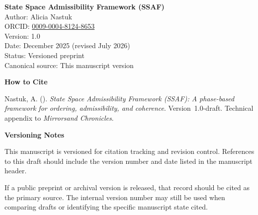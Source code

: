 \documentclass[aps,prx,onecolumn,11pt]{revtex4-2}
\theoremstyle{plain}
\theoremstyle{definition}
\theoremstyle{remark}
\begin{document}
\noindent
\textbf{State Space Admissibility Framework (SSAF)}\\
Author: Alicia Nastuk\\
ORCID: \href{https://orcid.org/0009-0004-8124-8653}{0009-0004-8124-8653}\\
Version: 1.0\\
Date: December 2025 (revised July 2026)\\
Status: Versioned preprint\\
Canonical source: This manuscript version

\vspace{0.75em}

\noindent
\textbf{How to Cite}

\noindent
Nastuk, A. (\the\year). \textit{State Space Admissibility Framework
(SSAF): A phase-based framework for ordering, admissibility, and
coherence}. Version~1.0-draft. Technical appendix to
\textit{Mirrorsand Chronicles}.

\vspace{0.75em}

\noindent
\textbf{Versioning Notes}

\noindent
This manuscript is versioned for citation tracking and revision
control. References to this draft should include the version number and
date listed in the manuscript header.

If a public preprint or archival version is released, that record
should be cited as the primary source. The internal version number may
still be used when comparing drafts or identifying the specific
manuscript state cited.


\end{document}
